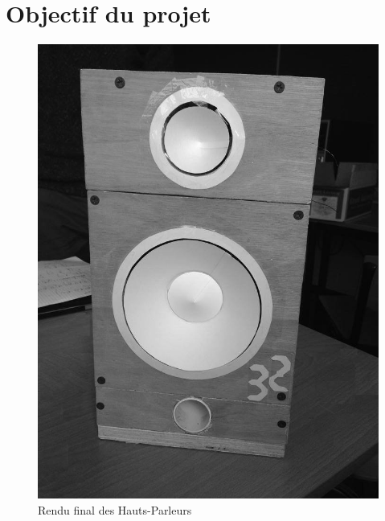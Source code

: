 \section{Objectif du projet}

\begin{figure}	
\begin{center}
\includegraphics[scale=0.5]{img/PhotoHP} 
\end{center}
\caption{Rendu final des Hauts-Parleurs}		
\label{fig:PhotoHP}		
\end{figure}